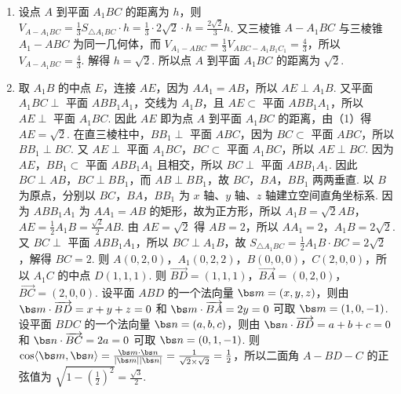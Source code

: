 \begin{solution}
\begin{enumerate}
\item 设点 \(A\) 到平面 \(A_1BC\) 的距离为 \(h\)，则
\(V_{A-A_1BC}=\frac13S_{\triangle A_1BC}\cdot h=\frac13\cdot 2\sqrt2\cdot h=\frac{2\sqrt2}{3}h\).
又三棱锥 \(A-A_1BC\) 与三棱锥 \(A_1-ABC\) 为同一几何体，而
\(V_{A_1-ABC}=\frac13V_{ABC-A_1B_1C_1}=\frac43\)，所以
\(V_{A-A_1BC}=\frac43\).
解得 \(h=\sqrt2\).
所以点 \(A\) 到平面 \(A_1BC\) 的距离为 \(\sqrt2\).
\item 取 \(A_1B\) 的中点 \(E\)，连接 \(AE\)，因为 \(AA_1=AB\)，所以
\(AE\perp A_1B\).
又平面 \(A_1BC\perp\) 平面 \(ABB_1A_1\)，交线为 \(A_1B\)，且 \(AE\subset\) 平面 \(ABB_1A_1\)，所以
\(AE\perp\) 平面 \(A_1BC\).
因此 \(AE\) 即为点 \(A\) 到平面 \(A_1BC\) 的距离，由（1）得 \(AE=\sqrt2\).
在直三棱柱中，\(BB_1\perp\) 平面 \(ABC\)，因为 \(BC\subset\) 平面 \(ABC\)，所以 \(BB_1\perp BC\).
又 \(AE\perp\) 平面 \(A_1BC\)，\(BC\subset\) 平面 \(A_1BC\)，所以 \(AE\perp BC\).
因为 \(AE\)，\(BB_1\subset\) 平面 \(ABB_1A_1\) 且相交，所以
\(BC\perp\) 平面 \(ABB_1A_1\).
因此 \(BC\perp AB\)，\(BC\perp BB_1\)，而 \(AB\perp BB_1\)，故 \(BC\)，\(BA\)，\(BB_1\) 两两垂直.
以 \(B\) 为原点，分别以 \(BC\)，\(BA\)，\(BB_1\) 为 \(x\) 轴、\(y\) 轴、\(z\) 轴建立空间直角坐标系.
因为 \(ABB_1A_1\) 为 \(AA_1=AB\) 的矩形，故为正方形，所以 \(A_1B=\sqrt2AB\)，\(AE=\frac12A_1B=\frac{\sqrt2}{2}AB\).
由 \(AE=\sqrt2\) 得 \(AB=2\)，所以 \(AA_1=2\)，\(A_1B=2\sqrt2\).
又 \(BC\perp\) 平面 \(ABB_1A_1\)，所以 \(BC\perp A_1B\)，故 \(S_{\triangle A_1BC}=\frac12A_1B\cdot BC=2\sqrt2\)，解得 \(BC=2\).
则 \(A(0,2,0)\)，\(A_1(0,2,2)\)，\(B(0,0,0)\)，\(C(2,0,0)\)，所以 \(A_1C\) 的中点 \(D(1,1,1)\).
则 \(\overrightarrow{BD}=(1,1,1)\)，\(\overrightarrow{BA}=(0,2,0)\)，\(\overrightarrow{BC}=(2,0,0)\).
设平面 \(ABD\) 的一个法向量 \(\bs m=(x,y,z)\)，则由 \(\bs m\cdot \overrightarrow{BD}=x+y+z=0\) 和 \(\bs m\cdot \overrightarrow{BA}=2y=0\) 可取 \(\bs m=(1,0,-1)\).
设平面 \(BDC\) 的一个法向量 \(\bs n=(a,b,c)\)，则由 \(\bs n\cdot \overrightarrow{BD}=a+b+c=0\) 和 \(\bs n\cdot \overrightarrow{BC}=2a=0\) 可取 \(\bs n=(0,1,-1)\).
则 \(\cos\langle\bs m,\bs n\rangle=\frac{\bs m\cdot \bs n}{|\bs m||\bs n|}=\frac{1}{\sqrt2\times \sqrt2}=\frac12\)，所以二面角 \(A-BD-C\) 的正弦值为 \(\sqrt{1-\left(\frac12\right)^2}=\frac{\sqrt3}{2}\).
\end{enumerate}
\end{solution}

